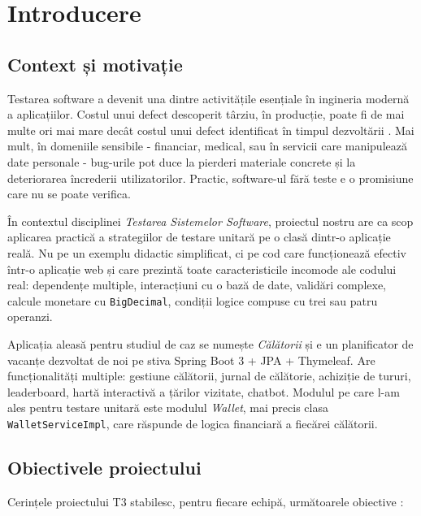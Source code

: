 \chapter{Introducere}
\label{ch:intro}

\section{Context și motivație}

Testarea software a devenit una dintre activitățile esențiale în ingineria modernă a aplicațiilor. Costul unui defect descoperit târziu, în producție, poate fi de mai multe ori mai mare decât costul unui defect identificat în timpul dezvoltării \cite{myers2011}. Mai mult, în domeniile sensibile - financiar, medical, sau în servicii care manipulează date personale - bug-urile pot duce la pierderi materiale concrete și la deteriorarea încrederii utilizatorilor. Practic, software-ul fără teste e o promisiune care nu se poate verifica.

În contextul disciplinei \textit{Testarea Sistemelor Software}, proiectul nostru are ca scop aplicarea practică a strategiilor de testare unitară pe o clasă dintr-o aplicație reală. Nu pe un exemplu didactic simplificat, ci pe cod care funcționează efectiv într-o aplicație web și care prezintă toate caracteristicile incomode ale codului real: dependențe multiple, interacțiuni cu o bază de date, validări complexe, calcule monetare cu \texttt{BigDecimal}, condiții logice compuse cu trei sau patru operanzi.

Aplicația aleasă pentru studiul de caz se numește \textit{Călătorii} și e un planificator de vacanțe dezvoltat de noi pe stiva Spring Boot 3 + JPA + Thymeleaf. Are funcționalități multiple: gestiune călătorii, jurnal de călătorie, achiziție de tururi, leaderboard, hartă interactivă a țărilor vizitate, chatbot. Modulul pe care l-am ales pentru testare unitară este modulul \textit{Wallet}, mai precis clasa \texttt{WalletServiceImpl}, care răspunde de logica financiară a fiecărei călătorii.

\section{Obiectivele proiectului}

Cerințele proiectului T3 stabilesc, pentru fiecare echipă, următoarele obiective \cite{tss_assignment}:

